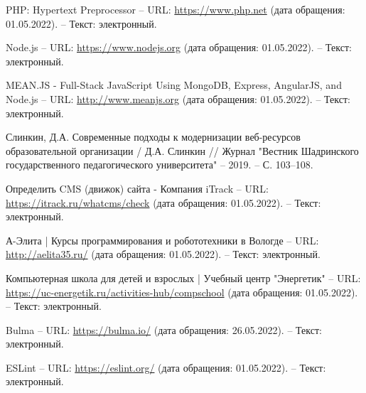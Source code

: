 \begin{thebibliography}{00}
        PHP: Hypertext Preprocessor
        --
        URL:
        \href{https://www.php.net}{https://www.php.net}
        (дата обращения: 01.05.2022).
        --
        Текст: электронный.

        Node.js
        --
        URL:
        \href{https://www.nodejs.org}{https://www.nodejs.org}
        (дата обращения: 01.05.2022).
        --
        Текст: электронный.


        MEAN.JS - Full-Stack JavaScript Using MongoDB, Express, AngularJS, and Node.js
        --
        URL:
        \href{http://www.meanjs.org}{http://www.meanjs.org}
        (дата обращения: 01.05.2022).
        --
        Текст: электронный.

        Слинкин, Д.А. Современные подходы к модернизации веб-ресурсов образовательной организации
        /
        Д.А. Слинкин
        //
        Журнал "Вестник Шадринского государственного педагогического университета"
        --
        2019.
        --
        С. 103--108.

        Определить CMS (движок) сайта - Компания iTrack
        --
        URL:
        \href{https://itrack.ru/whatcms/check}{https://itrack.ru/whatcms/check}
        (дата обращения: 01.05.2022).
        --
        Текст: электронный.

        А-Элита | Курсы программирования и робототехники в Вологде
        --
        URL:
        \href{http://aelita35.ru/}{http://aelita35.ru/}
        (дата обращения: 01.05.2022).
        --
        Текст: электронный.

        Компьютерная школа для детей и взрослых | Учебный центр "Энергетик"
        --
        URL:
        \href{https://uc-energetik.ru/activities-hub/compschool}{https://uc-energetik.ru/activities-hub/compschool}
        (дата обращения: 01.05.2022).
        --
        Текст: электронный.

        Bulma
        --
        URL:
        \href{https://bulma.io/}{https://bulma.io/}
        (дата обращения: 26.05.2022).
        --
        Текст: электронный.

        ESLint
        --
        URL:
        \href{https://eslint.org/}{https://eslint.org/}
        (дата обращения: 01.05.2022).
        --
        Текст: электронный.


\end{thebibliography}
